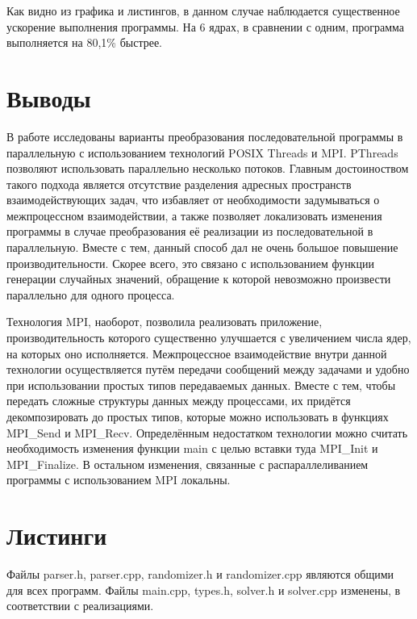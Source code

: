 \begin{enumerate}
Как видно из графика и листингов, в данном случае наблюдается существенное ускорение выполнения программы. На 6 ядрах, в сравнении с одним, программа выполняется на 80,1\% быстрее.

\end{enumerate}


\section{Выводы}

В работе исследованы варианты преобразования последовательной программы в параллельную с использованием технологий POSIX Threads и MPI. PThreads позволяют использовать параллельно несколько потоков. Главным достоиноством такого подхода является отсутствие разделения адресных пространств взаимодействующих задач, что  избавляет от необходимости задумываться о межпроцессном взаимодействии, а также позволяет локализовать изменения программы в случае преобразования её реализации из последовательной в параллельную. Вместе с тем, данный способ дал не очень большое повышение производительности. Скорее всего, это связано с использованием функции генерации случайных значений, обращение к которой невозможно произвести параллельно для одного процесса.

Технология MPI, наоборот, позволила реализовать приложение, производительность которого существенно улучшается с увеличением числа ядер, на которых оно исполняется. Межпроцессное взаимодействие внутри данной технологии осуществляется путём передачи сообщений между задачами и удобно при использовании простых типов передаваемых данных. Вместе с тем, чтобы передать сложные структуры данных между процессами, их придётся декомпозировать до простых типов, которые можно использовать в функциях MPI\_Send и MPI\_Recv. Определённым недостатком технологии можно считать необходимость изменения функции main с целью вставки туда MPI\_Init и MPI\_Finalize. В остальном изменения, связанные с распараллеливанием программы с использованием MPI локальны.


\section{Листинги}

Файлы parser.h, parser.cpp, randomizer.h и randomizer.cpp являются общими для всех программ. Файлы main.cpp, types.h, solver.h и solver.cpp изменены, в соответствии с реализациями.

